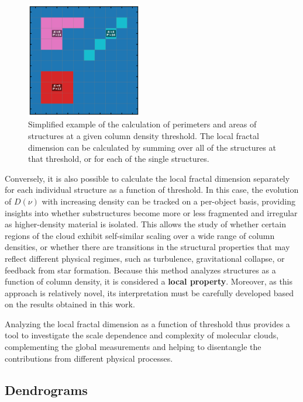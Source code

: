 \begin{figure}[t]
    \centering
    \includegraphics[width=0.45\textwidth]{figures/example_calculations.png}
    \caption{Simplified example of the calculation of perimeters and areas of structures at a given column density threshold. The local fractal dimension can be calculated by summing over all of the structures at that threshold, or for each of the single structures.}
    \label{fig:local_fractal_dimension_example}
\end{figure}

Conversely, it is also possible to calculate the local fractal dimension separately for each individual structure as a function of threshold. In this case, the evolution of $D(\nu)$ with increasing density can be tracked on a per-object basis, providing insights into whether substructures become more or less fragmented and irregular as higher-density material is isolated. This allows the study of whether certain regions of the cloud exhibit self-similar scaling over a wide range of column densities, or whether there are transitions in the structural properties that may reflect different physical regimes, such as turbulence, gravitational collapse, or feedback from star formation.
Because this method analyzes structures as a function of column density, it is considered a \textbf{local property}. Moreover, as this approach is relatively novel, its interpretation must be carefully developed based on the results obtained in this work.

Analyzing the local fractal dimension as a function of threshold thus provides a tool to investigate the scale dependence and complexity of molecular clouds, complementing the global measurements and helping to disentangle the contributions from different physical processes.

\subsection{Dendrograms}

